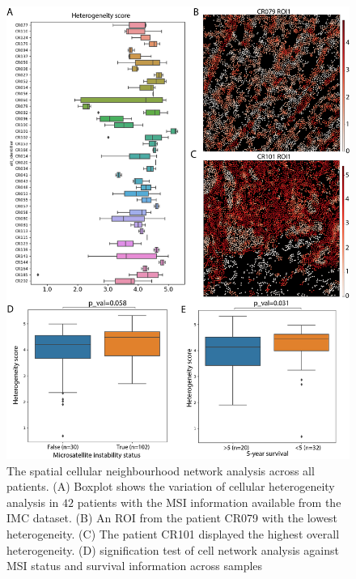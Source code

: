 \begin{figure}
    \centering
    \includegraphics[width=0.9\columnwidth]{Chapter4/Figures/Chap4_figure6_IMC_network_analysis.png}
    \caption[IMC spatial cellular neighbourhood network analysis across the dataset]{The spatial cellular neighbourhood network analysis across all patients. (A) Boxplot shows the variation of cellular heterogeneity analysis in $42$ patients with the MSI information available from the IMC dataset. (B) An ROI from the patient CR079 with the lowest heterogeneity. (C) The patient CR101 displayed the highest overall heterogeneity. (D) signification test of cell network analysis against MSI status and survival information across samples}
    
    \label{Chap4:fig2:IMC_network_analysis}
    
\end{figure}
